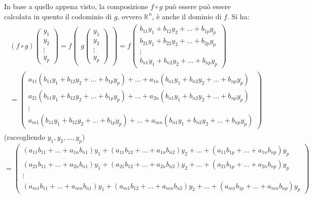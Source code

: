In base a quello appena visto, la composizione $f\circ g$ può essere può essere calcolata in
quento il codominio di $g$, ovvero $\mathbb{K}^n$, è anche il dominio di $f$. Si ha:
\begin{eqnarray}
  \label{eq:4.20}
  \begin{matrix}
   (f\circ g)
  \begin{pmatrix}
    y_1\\
    y_2\\
    \vdots\\
    y_p
  \end{pmatrix}=f
  \begin{pmatrix}
    g
    \begin{pmatrix}
      y_1\\
      y_2\\
      \vdots\\
      y_p
    \end{pmatrix}
  \end{pmatrix}=f
  \begin{pmatrix}
    b_{11}y_1+b_{12}y_2+\dots+b_{1p}y_p\\
    b_{21}y_1+b_{22}y_2+\dots+b_{2p}y_p\\
    \vdots\\
    b_{n1}y_1+b_{n2}y_2+\dots+b_{np}y_p
  \end{pmatrix}\\=
  \begin{pmatrix}
    a_{11}(b_{11}y_1+b_{12}y_2+\dots+b_{1p}y_p) +\dots+a_{1n}(b_{n1}y_1+b_{n2}y_2+\dots+b_{np}y_p)\\ 
    a_{21}(b_{11}y_1+b_{12}y_2+\dots+b_{1p}y_p) +\dots+a_{2n}(b_{n1}y_1+b_{n2}y_2+\dots+b_{np}y_p)\\
    \vdots\\
    a_{m1}(b_{11}y_1+b_{12}y_2+\dots+b_{1p}y_p) +\dots+a_{mn}(b_{n1}y_1+b_{n2}y_2+\dots+b_{np}y_p)
  \end{pmatrix}
  \end{matrix}
\end{eqnarray}
(raccogliendo $y_1,y_2,\dots,y_p$)
\begin{equation}
  \label{eq:4.21}
  =
  \begin{pmatrix}
    (a_{11}b_{11}+\dots+a_{1n}b_{n1})y_1+(a_{11}b_{12}+\dots+a_{1n}b_{n2})y_2+\dots+(a_{11}b_{1p}+\dots+a_{1n}b_{np})y_p\\
    (a_{21}b_{11}+\dots+a_{2n}b_{n1})y_1+(a_{21}b_{12}+\dots+a_{2n}b_{n2})y_2+\dots+(a_{21}b_{1p}+\dots+a_{2n}b_{np})y_p\\
    \vdots\\
    (a_{m1}b_{11}+\dots+a_{mn}b_{n1})y_1+(a_{m1}b_{12}+\dots+a_{mn}b_{n2})y_2+\dots+(a_{m1}b_{1p}+\dots+a_{mn}b_{np})y_p
  \end{pmatrix}
\end{equation}
